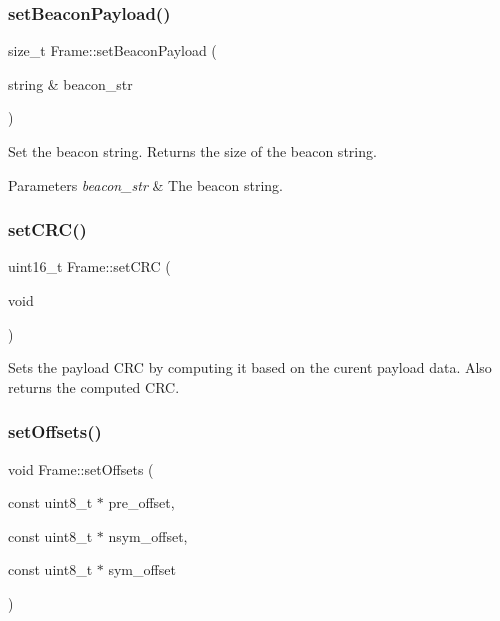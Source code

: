 \subsubsection{\texorpdfstring{set\+Beacon\+Payload()}{setBeaconPayload()}}
{\footnotesize\ttfamily size\+\_\+t Frame\+::set\+Beacon\+Payload (\begin{DoxyParamCaption}\item[{string \&}]{beacon\+\_\+str }\end{DoxyParamCaption})\hspace{0.3cm}{\ttfamily [inline]}}

Set the beacon string. Returns the size of the beacon string. 
\begin{DoxyParams}{Parameters}
{\em beacon\+\_\+str} & The beacon string. \\
\hline
\end{DoxyParams}
\mbox{\label{classFrame_aa2de2dba681188cc6ab00dfc42d15426}} 
\subsubsection{\texorpdfstring{set\+C\+R\+C()}{setCRC()}}
{\footnotesize\ttfamily uint16\+\_\+t Frame\+::set\+C\+RC (\begin{DoxyParamCaption}\item[{void}]{ }\end{DoxyParamCaption})\hspace{0.3cm}{\ttfamily [inline]}}

Sets the payload C\+RC by computing it based on the curent payload data. Also returns the computed C\+RC. \mbox{\label{classFrame_ac25e10413d25b9eea2502c1c02d457e0}} 
\subsubsection{\texorpdfstring{set\+Offsets()}{setOffsets()}}
{\footnotesize\ttfamily void Frame\+::set\+Offsets (\begin{DoxyParamCaption}\item[{const uint8\+\_\+t $\ast$}]{pre\+\_\+offset,  }\item[{const uint8\+\_\+t $\ast$}]{nsym\+\_\+offset,  }\item[{const uint8\+\_\+t $\ast$}]{sym\+\_\+offset }\end{DoxyParamCaption})\hspace{0.3cm}{\ttfamily [inline]}}

